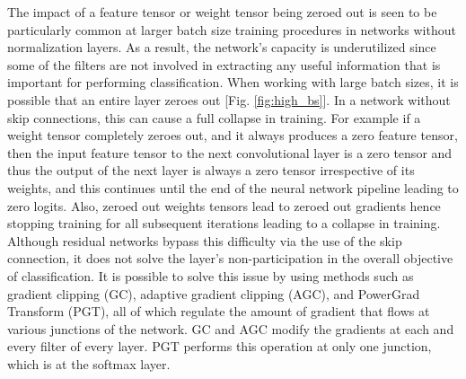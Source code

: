 \documentclass[times,sort&compress]{elsarticle}
\begin{document}
The impact of a feature tensor or weight tensor being zeroed out is seen to be
particularly common at larger batch size training procedures in networks without
normalization layers. As a result, the network's capacity is underutilized since some of
the filters are not involved in extracting any useful information that is important for
performing classification. When working with large batch sizes, it is possible that an
entire layer zeroes out [Fig. \ref{fig:high_bs}]. In a network without skip connections,
this can cause a full collapse in training. For example if a weight tensor completely
zeroes out, and it always produces a zero feature tensor, then the input feature tensor
to the next convolutional layer is a zero tensor and thus the output of the next layer
is always a zero tensor irrespective of its weights, and this continues until the end of
the neural network pipeline leading to zero logits. Also, zeroed out weights tensors
lead to zeroed out gradients hence stopping training for all subsequent iterations
leading to a collapse in training. Although residual networks bypass this difficulty via
the use of the skip connection, it does not solve the layer's non-participation in the
overall objective of classification. It is possible to solve this issue by using methods
such as gradient clipping (GC), adaptive gradient clipping (AGC), and PowerGrad
Transform (PGT), all of which regulate the amount of gradient that flows at various
junctions of the network. GC and AGC modify the gradients at each and every filter of
every layer. PGT performs this operation at only one junction, which is at the softmax
layer.
\end{document}
